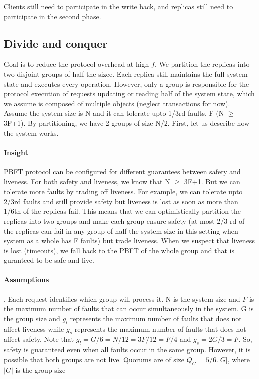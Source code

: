 \documentclass[twocolumn,10pt]{article}
\begin{document}
Clients still
need to participate in the write back, and replicas still need to participate in the
second phase. 


\subsection{Divide and conquer}

Goal is to reduce the protocol overhead at high $f$. We partition
the replicas into two disjoint groups of half the sizee. Each replica still maintains the 
full system
state and executes every operation. However, only a group is responsible for the
protocol execution of requests updating or reading half of the system state, which 
we assume is composed of multiple objects (neglect transactions for now). 
Assume the system size is N and it can tolerate upto 1/3rd faults, F
(N $\ge$ 3F+1). By partitioning, we have 2 groups of size N/2. First, let us describe how the
system works. 



\paragraph{Insight} PBFT protocol can be configured for different guarantees between safety
and liveness. For both safety and liveness, we know that N $\ge$ 3F+1. But we can tolerate
more faults by trading off  liveness. For example, we can tolerate
upto 2/3rd faults and still provide safety but liveness is lost as soon as more than 1/6th 
of the replicas fail. This means that we can optimistically partition
the replicas into two groups and make each group ensure safety (at most
2/3-rd of the replicas can fail in any group of half the system size in this setting when system as a whole
has F faults) but trade liveness. When
we suspect that liveness is lost (timeouts), we fall back to the PBFT of the whole group and
that is guranteed to be safe and live. 

\paragraph{Assumptions} . Each request identifies which group will
process it.  N is the system size and $F$ is the maximum number of faults that can occur
simultaneously in the system. G is the group size and $g_l$ represents the maximum number of faults
that does not affect liveness while $g_s$ represents the maximum number of faults that does
not affect safety. Note that $g_l=G/6=N/12=3F/12=F/4$ and $g_s = 2G/3=F$. So, safety is guaranteed
even when all faults occur in the same group. However, it is possible that both groups are not live.
Quorums are of size $Q_G=5/6.|G|$, where $|G|$ is the group size
\end{document}
